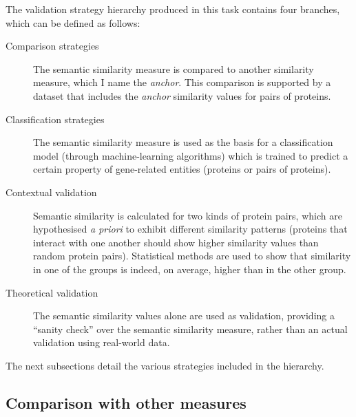 The validation strategy hierarchy produced in this task contains four branches, which can be defined as follows:
\begin{description}
    \item[Comparison strategies] The semantic similarity measure is compared to another similarity measure, which I name the \emph{anchor}. This comparison is supported by a dataset that includes the \emph{anchor} similarity values for pairs of proteins.
    
    \item[Classification strategies] The semantic similarity measure is used as the basis for a classification model (through machine-learning algorithms) which is trained to predict a certain property of gene-related entities (\eg proteins or pairs of proteins).
    
    \item[Contextual validation] Semantic similarity is calculated for two kinds of protein pairs, which are hypothesised \emph{a priori} to exhibit different similarity patterns (\eg proteins that interact with one another should show higher similarity values than random protein pairs). Statistical methods are used to show that similarity in one of the groups is indeed, on average, higher than in the other group.
    
    \item[Theoretical validation] The semantic similarity values alone are used as validation, providing a ``sanity check'' over the semantic similarity measure, rather than an actual validation using real-world data.
\end{description}

The next subsections detail the various strategies included in the hierarchy.


\subsection{Comparison with other measures} \label{sub:hierarchy/comparison}

